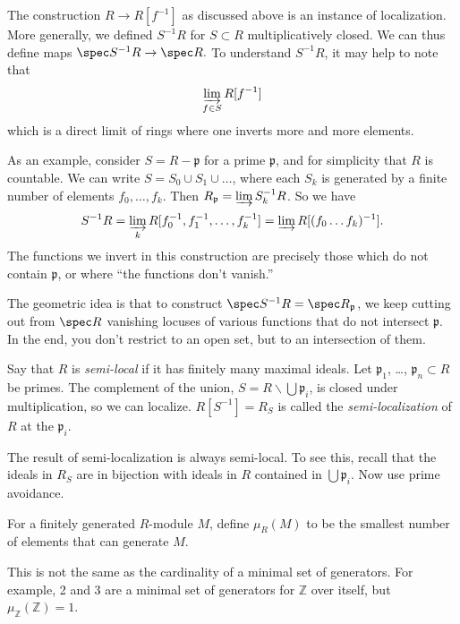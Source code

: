 \begin{remark} 
The construction $R \to R[f^{-1}]$ as discussed above is an
instance of
localization. More generally, we defined $S^{-1}R$ for $S
\subset R$
multiplicatively closed. We can thus define maps
\( \spec S^{-1}R \to \spec R . \)
To understand $S^{-1}R$, it may help to note that
\[ \varinjlim_{f \in S} R[f^{-1}]  \]
which is a direct limit of rings where one inverts more and more elements.

As an example, consider $S = R - \mathfrak{p}$ for a prime
$\mathfrak{p}$, and for
simplicity that $R$ is countable. We can write $S =
S_0 \cup S_1 \cup \dots$, where each $S_k$ is generated by a
finite number of
elements $f_0, \dots, f_k$. Then $R_{\mathfrak{p}} = \varinjlim
S_k^{-1} R$.
So we have
\[ S^{-1}R = \varinjlim_k R[f_0^{-1} , f_1^{-1}, \dots, f_k^{-1}
] = \varinjlim
R[(f_0\dots f_k)^{-1}]. \]
The functions we invert in this construction are precisely those
which do not
contain $\mathfrak{p}$, or where ``the functions don't vanish.''

The geometric idea is
that to construct $\spec S^{-1}R = \spec R_{\mathfrak{p}}$, we
keep cutting out
from $\spec R$ vanishing locuses of various functions that do
not
intersect $\mathfrak{p}$. In the end, you don't restrict to an
open set, but
to an intersection of them.
\end{remark} 
\begin{exercise} \label{semilocal} 
Say that    $R$ is \emph{semi-local} if it has finitely many maximal ideals.
Let $\mathfrak{p}_1$, \dots, $\mathfrak{p}_n\subset R$ be primes. The complement of
the union, $S=R\smallsetminus \bigcup \mathfrak{p}_i$, is closed under
multiplication, so we can
 localize. $R[S^{-1}] = R_S$ is called the \emph{semi-localization}
  of $R$ at the $\mathfrak{p}_i$.
 
The result of semi-localization is always semi-local. To see this, recall that
the ideals
 in $R_S$ are in bijection with ideals in $R$ contained in $\bigcup
 \mathfrak{p}_i$. Now use prime avoidance.
\end{exercise}

\begin{definition}
For a finitely generated $R$-module $M$, define $\mu_R(M)$ to be the smallest
number
   of elements that can generate $M$.
 \end{definition}
This is not the same as the cardinality of a minimal set of generators. For
example, 2
and 3 are a minimal set of generators for $\mathbb{Z}$ over itself, but
$\mu_\mathbb{Z} (\mathbb{Z}) =1$.

